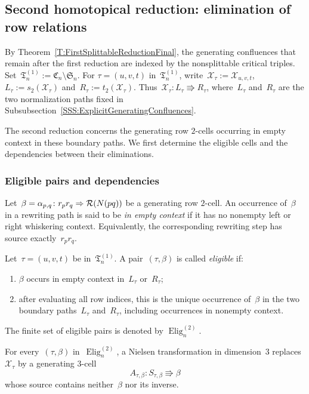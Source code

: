 \documentclass[a4paper, twoside, 11pt, english]{article}
\begin{document}
\subsection{Second homotopical reduction: elimination of row relations}
\label{SS:SecondReductionRow}

By Theorem~\ref{T:FirstSplittableReductionFinal}, the generating
confluences that remain after the first reduction are indexed by the
nonsplittable critical triples. Set~$
\mathfrak T_n^{(1)}
:=
\mathfrak C_n\setminus\mathfrak S_n$.
For $\tau=(u,v,t)$ in~$\mathfrak T_n^{(1)}$, write~$
\mathcal X_\tau:=\mathcal X_{u,v,t}$,~$L_\tau:=s_2(\mathcal X_\tau)$ and~$
R_\tau:=t_2(\mathcal X_\tau)$.
Thus~$\mathcal X_\tau\colon L_\tau\Rrightarrow R_\tau$, where~$L_\tau$ and~$R_\tau$ are the two normalization paths fixed in
Subsubsection~\ref{SSS:ExplicitGeneratingConfluences}.

The second reduction concerns the generating row $2$-cells occurring
in empty context in these boundary paths. We first determine the
eligible cells and the dependencies between their eliminations.

\subsubsection{Eligible pairs and dependencies}

Let~$\beta=\alpha_{p,q}\colon
r_pr_q\Rightarrow\mathcal{R}(N(pq))$ be a generating row $2$-cell. An occurrence of~$\beta$ in a rewriting
path is said to be \emph{in empty context} if it has no nonempty left
or right whiskering context. Equivalently, the corresponding rewriting
step has source exactly~$r_pr_q$.

Let~$\tau=(u,v,t)$ be in~$\mathfrak T_n^{(1)}$. A pair~$(\tau,\beta)$ is
called \emph{eligible} if:
\begin{enumerate}[\bf i)]
\item $\beta$ occurs in empty context in~$L_\tau$ or~$R_\tau$;
\item after evaluating all row indices, this is the unique occurrence
of~$\beta$ in the two boundary paths~$L_\tau$ and~$R_\tau$, including
occurrences in nonempty context.
\end{enumerate}

The finite set of eligible pairs is denoted by
$\operatorname{Elig}^{(2)}_n$. 

\begin{lemma}
\label{L:EligiblePairGivesCollapsibleCell}
For every~$(\tau,\beta)$ in~$\operatorname{Elig}^{(2)}_n$, a Nielsen
transformation in dimension~$3$ replaces~$\mathcal X_\tau$ by a
generating $3$-cell
\[
A_{\tau,\beta}\colon
S_{\tau,\beta}\Rrightarrow\beta
\]
whose source contains neither~$\beta$ nor its inverse.
\end{lemma}
\end{document}

